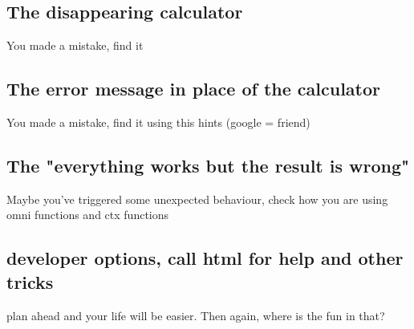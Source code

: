\subsection{The disappearing calculator}
You made a mistake, find it
\subsection{The error message in place of the calculator}
You made a mistake, find it using this hints (google = friend)
\subsection{The "everything works but the result is wrong"}
Maybe you've triggered some unexpected behaviour, check how you are using omni functions and ctx functions
\subsection{developer options, call html for help and other tricks}
plan ahead and your life will be easier. Then again, where is the fun in that?


